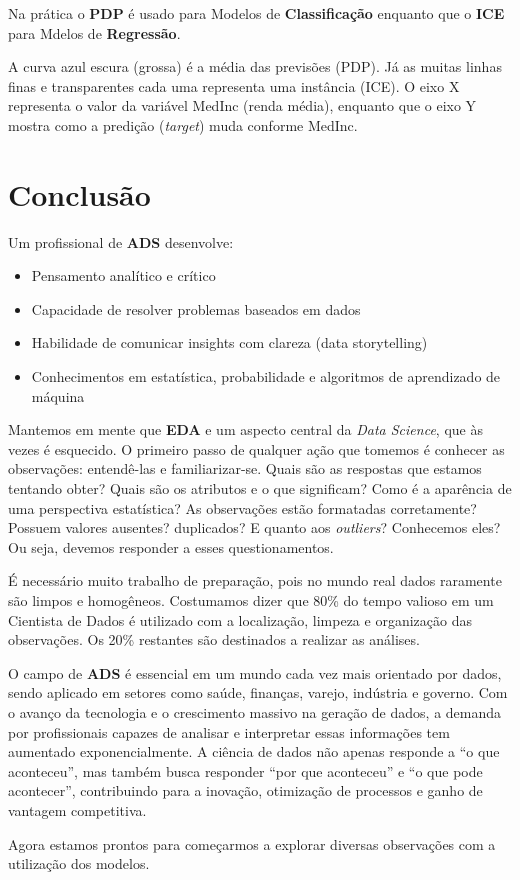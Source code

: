 Na prática o \textbf{PDP} é usado para Modelos de \textbf{Classificação} enquanto que o \textbf{ICE} para Mdelos de \textbf{Regressão}.

A curva azul escura (grossa) é a média das previsões (PDP). Já as muitas linhas finas e transparentes cada uma representa uma instância (ICE). O eixo X representa o valor da variável MedInc (renda média), enquanto que o eixo Y mostra como a predição (\textit{target}) muda conforme MedInc.
	
\section{Conclusão}
Um profissional de \textbf{ADS} desenvolve:
\begin{itemize}[nolistsep]
	\item Pensamento analítico e crítico
	\item Capacidade de resolver problemas baseados em dados
	\item Habilidade de comunicar insights com clareza (data storytelling)
	\item Conhecimentos em estatística, probabilidade e algoritmos de aprendizado de máquina
\end{itemize}

Mantemos em mente que \textbf{EDA} e um aspecto central da \textit{Data Science}, que às vezes é esquecido. O primeiro passo de qualquer ação que tomemos é conhecer as observações: entendê-las e familiarizar-se. Quais são as respostas que estamos tentando obter? Quais são os atributos e o que significam? Como é a aparência de uma perspectiva estatística? As observações estão formatadas corretamente? Possuem valores ausentes? duplicados? E quanto aos \textit{outliers}? Conhecemos eles? Ou seja, devemos responder a esses questionamentos.

É necessário muito trabalho de preparação, pois no mundo real dados raramente são limpos e homogêneos. Costumamos dizer que 80\% do tempo valioso em um Cientista de Dados é utilizado com a localização, limpeza e organização das observações. Os 20\% restantes são destinados a realizar as análises.

O campo de \textbf{ADS} é essencial em um mundo cada vez mais orientado por dados, sendo aplicado em setores como saúde, finanças, varejo, indústria e governo. Com o avanço da tecnologia e o crescimento massivo na geração de dados, a demanda por profissionais capazes de analisar e interpretar essas informações tem aumentado exponencialmente. A ciência de dados não apenas responde a “o que aconteceu”, mas também busca responder “por que aconteceu” e “o que pode acontecer”, contribuindo para a inovação, otimização de processos e ganho de vantagem competitiva.

Agora estamos prontos para começarmos a explorar diversas observações com a utilização dos modelos.

\clearpage